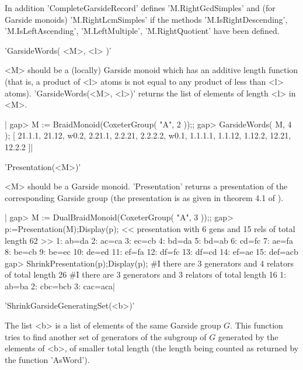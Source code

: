 In  addition 'CompleteGarsideRecord'  defines 'M.RightGcdSimples'  and (for
Garside  monoids) 'M.RightLcmSimples' if the methods 'M.IsRightDescending',
'M.IsLeftAscending', 'M.LeftMultiple', 'M.RightQuotient' have been defined.


'GarsideWords( <M>, <l> )'

<M>  should  be  a  (locally)  Garside  monoid which has an additive length
function  (that is, a product  of <l> atoms is  not equal to any product of
less than <l> atoms). 'GarsideWords(<M>, <l>)' returns the list of elements
of length <l> in <M>.

|    gap>  M := BraidMonoid(CoxeterGroup( "A", 2 ));;
    gap>  GarsideWords( M, 4 );
    [ 21.1.1, 21.12, w0.2, 2.21.1, 2.2.21, 2.2.2.2, w0.1, 1.1.1.1,
      1.1.12, 1.12.2, 12.21, 12.2.2 ]|


'Presentation(<M>)'

<M>  should be a  Garside monoid. 'Presentation'  returns a presentation of
the  corresponding Garside group  (the presentation is  as given in theorem
4.1 of \cite{DePa99}).

|    gap>  M := DualBraidMonoid(CoxeterGroup( "A", 3 ));;
    gap>  p:=Presentation(M);Display(p);
    << presentation with 6 gens and 15 rels of total length 62 >>
    1: ab=da
    2: ac=ca
    3: ec=cb
    4: bd=da
    5: bd=ab
    6: cd=fc
    7: ae=fa
    8: be=cb
    9: be=ec
    10: de=ed
    11: ef=fa
    12: df=fc
    13: df=cd
    14: ef=ae
    15: def=acb
    gap>  ShrinkPresentation(p);Display(p);
    #I  there are 3 generators and 4 relators of total length 26
    #I  there are 3 generators and 3 relators of total length 16
    1: ab=ba
    2: cbc=bcb
    3: cac=aca|


'ShrinkGarsideGeneratingSet(<b>)'

The  list <b>  is a  list of  elements of  the same Garside group $G$. This
function  tries to find  another set of  generators of the  subgroup of $G$
generated by the elements of <b>, of smaller total length (the length being
counted  as returned by the function  'AsWord').

